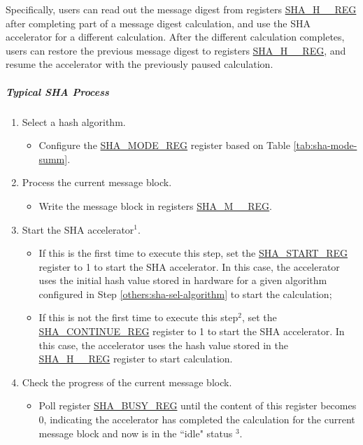 \documentclass[main\_\_EN.tex]{subfiles}
\begin{document}
Specifically, users can read out the message digest from registers \hyperref[regdesc:SHAHNREG]{SHA\_H\_\_REG} after completing part of a message digest calculation, and use the SHA accelerator for a different calculation. After the different calculation completes, users can restore the previous message digest to registers \hyperref[regdesc:SHAHNREG]{SHA\_H\_\_REG}, and resume the accelerator with the previously paused calculation.

\subparagraph{Typical SHA Process}

\begin{enumerate}
    \item \label{others:sha-sel-algorithm} Select a hash algorithm.
    \begin{itemize}
        \item Configure the \hyperref[regdesc:SHAMODEREG]{SHA\_MODE\_REG} register based on Table \ref{tab:sha-mode-summ}.
    \end{itemize}
    \item \label{others:sha-current-block} Process the current message block.
    \begin{itemize}
        \item Write the message block in registers \hyperref[regdesc:SHAMNREG]{SHA\_M\_\_REG}.
    \end{itemize}
    \item Start the SHA accelerator\hyperref[others:sha-note-typical-sha]{$^1$}.
    \begin{itemize}
        \item If this is the first time to execute this step, set the \hyperref[regdesc:SHASTARTREG]{SHA\_START\_REG} register to 1 to start the SHA accelerator. In this case, the accelerator uses the initial hash value stored in hardware for a given algorithm configured in Step \ref{others:sha-sel-algorithm} to start the calculation;
        \item If this is not the first time to execute this step\hyperref[others:sha-note-typical-sha]{$^2$}, set the \hyperref[regdesc:SHACONTINUEREG]{SHA\_CONTINUE\_REG} register to 1 to start the SHA accelerator. In this case, the accelerator uses the hash value stored in the \hyperref[regdesc:SHAHNREG]{SHA\_H\_\_REG} register to start calculation.
    \end{itemize}
    \item Check the progress of the current message block.
    \begin{itemize}
        \item Poll register \hyperref[regdesc:SHABUSYREG]{SHA\_BUSY\_REG} until the content of this register becomes 0, indicating the accelerator has completed the calculation for the current message block and now is in the ``idle" status \hyperref[others:sha-note-typical-sha]{$^3$}.
    \end{itemize}


\end{enumerate}
\end{document}
